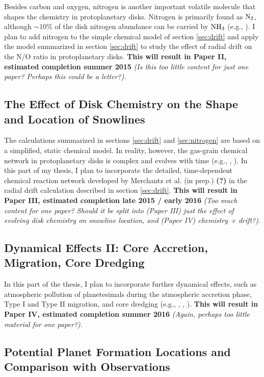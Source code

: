 \documentclass[manuscript]{aastex}
\begin{document}
Besides carbon and oxygen, nitrogen is another important volatile molecule that shapes the chemistry in protoplanetary disks. Nitrogen is primarily found as $\rm{N}_2$, although $\sim$$10$\% of the disk nitrogen abundance can be carried by $\rm{NH}_3$ (e.g., \citealt{lahuis00}). I plan to add nitrogen to the simple chemical model of section \ref{sec:drift} and apply the model summarized in section \ref{sec:drift} to study the effect of radial drift on the N/O ratio in protoplanetary disks. \textbf{This will result in Paper II, estimated completion summer 2015} \textit{(Is this too little content for just one paper? Perhaps this could be a letter?)}. 

\subsection{The Effect of Disk Chemistry on the Shape and Location of Snowlines}

The calculations summarized in sections \ref{sec:drift} and \ref{sec:nitrogen} are based on a simplified, static chemical model. In reality, however, the gas-grain chemical network in protoplanetary disks is complex and evolves with time (e.g., \citealt{bergin09}, \citealt{fogel11}). In this part of my thesis, I plan to incorporate the detailed, time-dependent chemical reaction network developed by Merchantz et al. (in prep.) \textbf{(?)} in the radial drift calculation described in section \ref{sec:drift}. \textbf{This will result in Paper III, estimated completion late 2015 / early 2016} \textit{(Too much content for one paper? Should it be split into (Paper III) just the effect of evolving disk chemistry on snowline location, and (Paper IV) chemistry + drift?)}.

\subsection{Dynamical Effects II: Core Accretion, Migration, Core Dredging}

In this part of the thesis, I plan to incorporate further dynamical effects, such as atmospheric pollution of planetesimals during the atmospheric accretion phase, Type I and Type II migration, and core dredging (e.g., \citealt{lodders09}, \citealt{stevenson85}, \citealt{guillot04}). \textbf{This will result in Paper IV, estimated completion summer 2016} \textit{(Again, perhaps too little material for one paper?)}.

\subsection{Potential Planet Formation Locations and Comparison with Observations}
\end{document}
